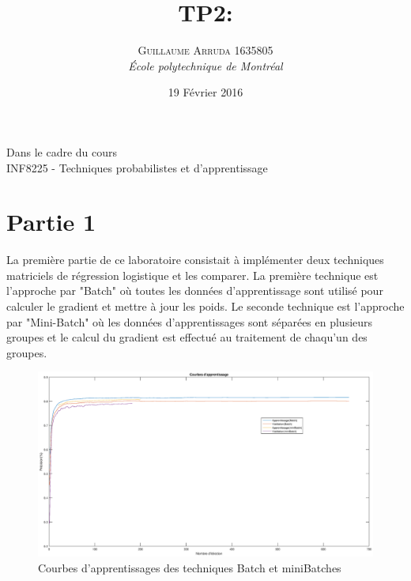 \documentclass[a4paper, 12pt]{article} %
\title{TP2: }
\author{\textsc{Guillaume Arruda 1635805} %
\vspace{10pt}
\\{\textit{École polytechnique de Montréal}}} %
\date{19 Février 2016} %
\makeatletter
\renewcommand{\maketitle}{ %
\begin{center} %

\vspace*{25pt} %
{\LARGE\@title} %

\vspace{125pt} %

{\large\@author} %

\vspace{125pt} %
Dans le cadre du cours
\\INF8225 - Techniques probabilistes et d'apprentissage
\vspace{125pt} %
\\\@date %
\vspace{125pt} %

\end{center}
}
\makeatother
\begin{document}
\thispagestyle{empty}
\clearpage\maketitle %
\pagebreak[4]

\setlength{\headheight}{15.0pt}
\pagestyle{fancy}
\fancyhead[C]{}

\section*{Partie 1}
La première partie de ce laboratoire consistait à implémenter deux techniques matriciels de régression logistique et les comparer. La première technique est l'approche par "Batch" où toutes les
données d'apprentissage sont utilisé pour calculer le gradient et mettre à jour les poids. Le seconde technique est l'approche par "Mini-Batch" où les données d'apprentissages sont séparées en
plusieurs groupes et le calcul du gradient est effectué au traitement de chaqu'un des groupes.
\begin{figure}[H]
\label{learningCurves}
\caption{Courbes d'apprentissages des techniques Batch et miniBatches}
\includegraphics[width=\textwidth,height=\textheight,keepaspectratio]{graphics/learningCurves.eps}
\end{figure}
\end{document}
